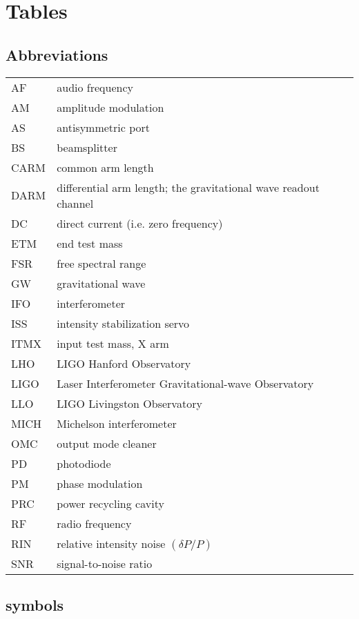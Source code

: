 \chapter{Tables}
\label{chapter6}
\section{Abbreviations}
\singlespacing
\begin{tabular}{|l|l|}
\hline 
AF   & audio frequency \\
AM   & amplitude modulation \\
AS   & antisymmetric port \\
BS   & beamsplitter \\
CARM & common arm length \\
DARM & differential arm length; the gravitational wave readout channel \\
DC   & direct current (i.e. zero frequency) \\
ETM  & end test mass \\
FSR  & free spectral range \\
GW   & gravitational wave \\
IFO  & interferometer \\
ISS  & intensity stabilization servo \\
ITMX & input test mass, X arm \\
LHO  & LIGO Hanford Observatory \\
LIGO & Laser Interferometer Gravitational-wave Observatory \\
LLO  & LIGO Livingston Observatory \\
MICH & Michelson interferometer \\
OMC  & output mode cleaner \\
PD   & photodiode \\
PM   & phase modulation \\
PRC  & power recycling cavity \\
RF   & radio frequency \\
RIN  & relative intensity noise $(\delta P/P)$ \\
SNR  & signal-to-noise ratio \\
\hline
\end{tabular}

\section{symbols}

